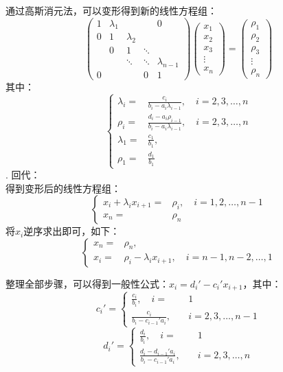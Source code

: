 \documentclass[UTF8,ctexart,a4paper,11pt,openany]{article}
\theoremstyle{definition}
\begin{document}
    通过高斯消元法，可以变形得到新的线性方程组：$$\left(\begin{array}{ccccc}1 & \lambda_{1} & & & 0 \\ 0 & 1 & \lambda_{2} & & \\ & 0 & 1 & \ddots & \\ & & \ddots & \ddots & \lambda_{n-1} \\ 0 & & & 0 & 1\end{array}\right)\left(\begin{array}{c}x_{1} \\ x_{2} \\ x_{3} \\ \vdots \\ x_{n}\end{array}\right)=\left(\begin{array}{c}\rho_{1} \\ \rho_{2} \\ \rho_{3} \\ \vdots \\ \rho_{n}\end{array}\right)$$其中：$$\left\{\begin{aligned} \lambda_{i}= & \frac{c_i}{b_i-a_i\lambda_{i-1}}, \quad i=2,3,\dots,n \\ \rho_{i}= & \frac{d_i-a_i\rho_{i-1}}{b_i-a_i\lambda_{i-1}}, \quad i=2,3,\dots,n \\ \lambda_{1}= & \frac{c_1}{b_1}, \\ \rho_{1}= & \frac{d_1}{b_1} \end{aligned}\right.$$
    . 回代：\\
    得到变形后的线性方程组：$$\left\{ \begin{aligned} x_i+\lambda_ix_{i+1}= & \rho_i, \quad i=1,2,\dots,n-1 \\ x_n= & \rho_n\end{aligned}\right.$$将$x_i$逆序求出即可，如下：$$\left\{ \begin{aligned} x_n= & \rho_n, \\ x_i= & \rho_i - \lambda_i x_{i+1}, \quad i=n-1, n-2,\dots,1 \end{aligned}\right.$$\par
    整理全部步骤，可以得到一般性公式：$x_i=d_i'-c_i'x_{i+1}$，其中：$$c_i'=\left\{ \begin{aligned} \frac{c_i}{b_i} , \quad i=&1 \\ \frac{c_i}{b_i-c_{i-1}'a_i} , \quad &i=2,3,\dots, n-1 \end{aligned}\right.$$ $$d_i'=\left\{ \begin{aligned} \frac{d_i}{b_i}, \quad i=&1 \\ \frac{d_i-d_{i-1}'a_i}{b_i-c_{i-1}'a_i}, \quad & i=2,3,\dots, n\end{aligned}\right.$$
\end{document}
